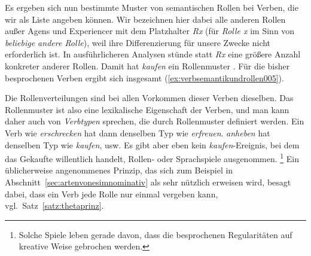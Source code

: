 

Es ergeben sich nun bestimmte Muster von semantischen Rollen bei Verben, die wir als Liste angeben können.
Wir bezeichnen hier dabei alle anderen Rollen außer Agens und Experiencer mit dem Platzhalter \textit{Rx} (für \textit{Rolle x} im Sinn von \textit{beliebige andere Rolle}), weil ihre Differenzierung für unsere Zwecke nicht erforderlich ist.
In ausführlicheren Analysen stünde statt \textit{Rx} eine größere Anzahl konkreter anderer Rollen.
Damit hat \zB \textit{kaufen} ein Rollenmuster .
Für die bisher besprochenen Verben ergibt sich insgesamt (\ref{ex:verbsemantikundrollen005}).

\begin{exe}
  \ex\label{ex:verbsemantikundrollen005}
  \begin{xlist}
  \end{xlist}
\end{exe}

Die Rollenverteilungen sind bei allen Vorkommen dieser Verben dieselben.
Das Rollenmuster ist also eine lexikalische Eigenschaft der Verben, und man kann daher auch von \textit{Verbtypen} sprechen, die durch Rollenmuster definiert werden.
Ein Verb wie \textit{erschrecken} hat dann denselben Typ wie \textit{erfreuen}.
\textit{anheben} hat denselben Typ wie \textit{kaufen}, usw.
Es gibt aber eben kein \textit{kaufen}-Ereignis, bei dem das Gekaufte willentlich handelt, Rollen- oder Sprachspiele ausgenommen.%
\footnote{Solche Spiele leben gerade davon, dass die besprochenen Regularitäten auf kreative Weise gebrochen werden.}
Ein üblicherweise angenommenes Prinzip, das sich zum Beispiel in Abschnitt~\ref{sec:artenvonesimnominativ} als sehr nützlich erweisen wird, besagt dabei, dass ein Verb jede Rolle nur einmal vergeben kann, vgl.\ Satz~\ref{satz:thetaprinz}.


